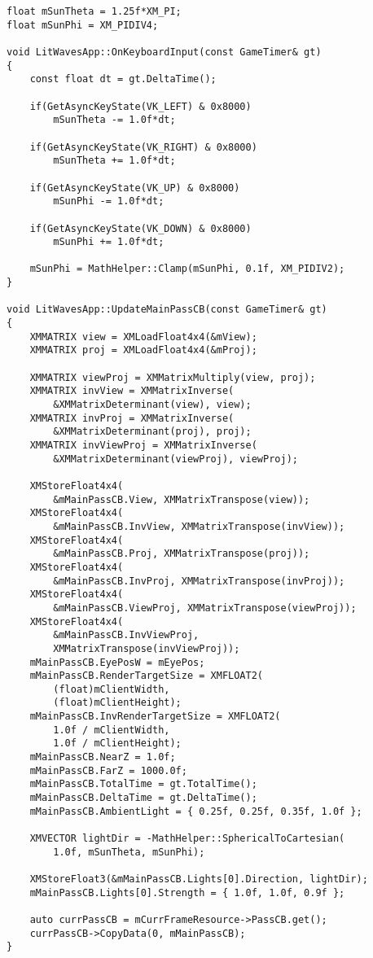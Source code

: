 \begin{lstlisting}
float mSunTheta = 1.25f*XM_PI;
float mSunPhi = XM_PIDIV4;

void LitWavesApp::OnKeyboardInput(const GameTimer& gt)
{
    const float dt = gt.DeltaTime();

    if(GetAsyncKeyState(VK_LEFT) & 0x8000)
        mSunTheta -= 1.0f*dt;

    if(GetAsyncKeyState(VK_RIGHT) & 0x8000)
        mSunTheta += 1.0f*dt;

    if(GetAsyncKeyState(VK_UP) & 0x8000)
        mSunPhi -= 1.0f*dt;

    if(GetAsyncKeyState(VK_DOWN) & 0x8000)
        mSunPhi += 1.0f*dt;

    mSunPhi = MathHelper::Clamp(mSunPhi, 0.1f, XM_PIDIV2);
}

void LitWavesApp::UpdateMainPassCB(const GameTimer& gt)
{
    XMMATRIX view = XMLoadFloat4x4(&mView);
    XMMATRIX proj = XMLoadFloat4x4(&mProj);

    XMMATRIX viewProj = XMMatrixMultiply(view, proj);
    XMMATRIX invView = XMMatrixInverse(
        &XMMatrixDeterminant(view), view);
    XMMATRIX invProj = XMMatrixInverse(
        &XMMatrixDeterminant(proj), proj);
    XMMATRIX invViewProj = XMMatrixInverse(
        &XMMatrixDeterminant(viewProj), viewProj);

    XMStoreFloat4x4(
        &mMainPassCB.View, XMMatrixTranspose(view));
    XMStoreFloat4x4(
        &mMainPassCB.InvView, XMMatrixTranspose(invView));
    XMStoreFloat4x4(
        &mMainPassCB.Proj, XMMatrixTranspose(proj));
    XMStoreFloat4x4(
        &mMainPassCB.InvProj, XMMatrixTranspose(invProj));
    XMStoreFloat4x4(
        &mMainPassCB.ViewProj, XMMatrixTranspose(viewProj));
    XMStoreFloat4x4(
        &mMainPassCB.InvViewProj, 
        XMMatrixTranspose(invViewProj));
    mMainPassCB.EyePosW = mEyePos;
    mMainPassCB.RenderTargetSize = XMFLOAT2(
        (float)mClientWidth, 
        (float)mClientHeight);
    mMainPassCB.InvRenderTargetSize = XMFLOAT2(
        1.0f / mClientWidth, 
        1.0f / mClientHeight);
    mMainPassCB.NearZ = 1.0f;
    mMainPassCB.FarZ = 1000.0f;
    mMainPassCB.TotalTime = gt.TotalTime();
    mMainPassCB.DeltaTime = gt.DeltaTime();
    mMainPassCB.AmbientLight = { 0.25f, 0.25f, 0.35f, 1.0f };

    XMVECTOR lightDir = -MathHelper::SphericalToCartesian(
        1.0f, mSunTheta, mSunPhi);

    XMStoreFloat3(&mMainPassCB.Lights[0].Direction, lightDir);
    mMainPassCB.Lights[0].Strength = { 1.0f, 1.0f, 0.9f };

    auto currPassCB = mCurrFrameResource->PassCB.get();
    currPassCB->CopyData(0, mMainPassCB);
}
\end{lstlisting}

